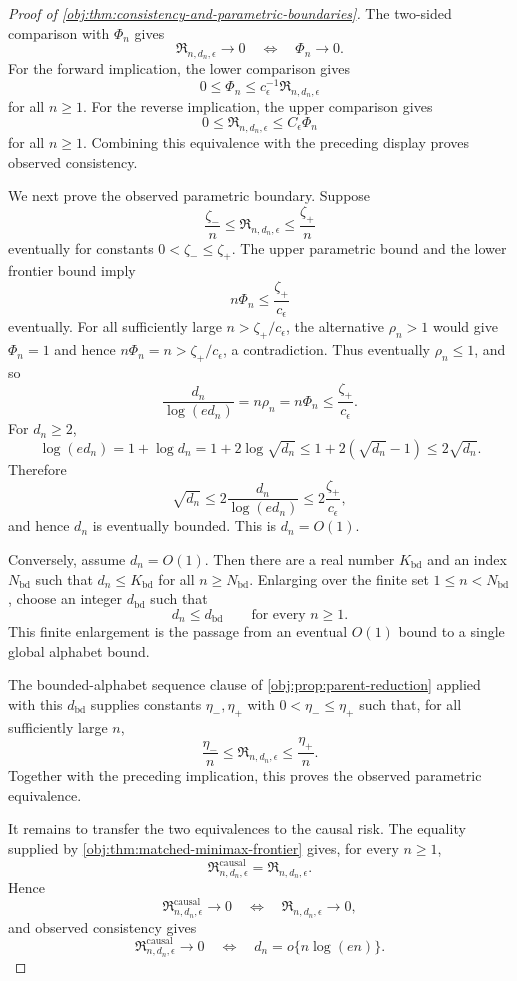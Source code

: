 \begin{proof}[Proof of \cref{obj:thm:consistency-and-parametric-boundaries}]
The two-sided comparison with \(\Phi_n\) gives
\[
\mathfrak R_{n,d_n,\epsilon}\to0
\quad\Longleftrightarrow\quad
\Phi_n\to0 .
\]
For the forward implication, the lower comparison gives
\[
0\le\Phi_n\le c_\epsilon^{-1}\mathfrak R_{n,d_n,\epsilon}
\]
for all \(n\ge1\).  For the reverse implication, the upper comparison gives
\[
0\le\mathfrak R_{n,d_n,\epsilon}\le C_\epsilon\Phi_n
\]
for all \(n\ge1\).  Combining this equivalence with the preceding display proves observed consistency. %

We next prove the observed parametric boundary.  Suppose
\[
\frac{\zeta_-}{n}
\le
\mathfrak R_{n,d_n,\epsilon}
\le
\frac{\zeta_+}{n}
\]
eventually for constants \(0<\zeta_-\le\zeta_+\).  The upper parametric bound and the lower frontier bound imply
\[
n\Phi_n\le \frac{\zeta_+}{c_\epsilon}
\]
eventually.  For all sufficiently large \(n>\zeta_+/c_\epsilon\), the alternative \(\rho_n>1\) would give \(\Phi_n=1\) and hence \(n\Phi_n=n>\zeta_+/c_\epsilon\), a contradiction.  Thus eventually \(\rho_n\le1\), and so
\[
\frac{d_n}{\log(ed_n)}
=
n\rho_n
=
n\Phi_n
\le
\frac{\zeta_+}{c_\epsilon}.
\]
For \(d_n\ge2\),
\[
\log(ed_n)
=
1+\log d_n
=
1+2\log\sqrt{d_n}
\le
1+2(\sqrt{d_n}-1)
\le
2\sqrt{d_n}.
\]
Therefore
\[
\sqrt{d_n}
\le
2\frac{d_n}{\log(ed_n)}
\le
2\frac{\zeta_+}{c_\epsilon},
\]
and hence \(d_n\) is eventually bounded.  This is \(d_n=O(1)\). %

Conversely, assume \(d_n=O(1)\).  Then there are a real number \(K_{\mathrm{bd}}\) and an index \(N_{\mathrm{bd}}\) such that \(d_n\le K_{\mathrm{bd}}\) for all \(n\ge N_{\mathrm{bd}}\).  Enlarging over the finite set \(1\le n<N_{\mathrm{bd}}\), choose an integer \(d_{\mathrm{bd}}\) such that
\[
d_n\le d_{\mathrm{bd}}
\qquad\text{for every } n\ge1 .
\]
This finite enlargement is the passage from an eventual \(O(1)\) bound to a single global alphabet bound. %

The bounded-alphabet sequence clause of \cref{obj:prop:parent-reduction} applied with this \(d_{\mathrm{bd}}\) supplies constants \(\eta_-,\eta_+\) with \(0<\eta_-\le\eta_+\) such that, for all sufficiently large \(n\),
\[
\frac{\eta_-}{n}
\le
\mathfrak R_{n,d_n,\epsilon}
\le
\frac{\eta_+}{n}.
\]
Together with the preceding implication, this proves the observed parametric equivalence. %

It remains to transfer the two equivalences to the causal risk.  The equality supplied by \cref{obj:thm:matched-minimax-frontier} gives, for every \(n\ge1\),
\[
\mathfrak R^{\mathrm{causal}}_{n,d_n,\epsilon}
=
\mathfrak R_{n,d_n,\epsilon}.
\]
Hence
\[
\mathfrak R^{\mathrm{causal}}_{n,d_n,\epsilon}\to0
\quad\Longleftrightarrow\quad
\mathfrak R_{n,d_n,\epsilon}\to0,
\]
and observed consistency gives
\[
\mathfrak R^{\mathrm{causal}}_{n,d_n,\epsilon}\to0
\quad\Longleftrightarrow\quad
d_n=o\{n\log(en)\}.
\] %


\end{proof}
